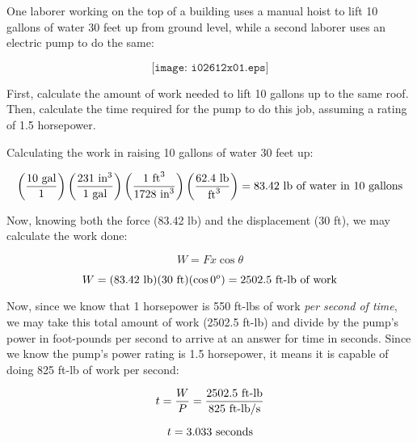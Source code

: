 

One laborer working on the top of a building uses a manual hoist to lift 10 gallons of water 30 feet up from ground level, while a second laborer uses an electric pump to do the same:

$$\texttt{[image: i02612x01.eps]}$$

First, calculate the amount of work needed to lift 10 gallons up to the same roof.  Then, calculate the time required for the pump to do this job, assuming a rating of 1.5 horsepower.







Calculating the work in raising 10 gallons of water 30 feet up:

$$\left( 10 \hbox{ gal} \over 1 \right) \left(231 \hbox{ in}^3 \over 1 \hbox{ gal} \right) \left(1 \hbox{ ft}^3 \over 1728 \hbox{ in}^3 \right) \left(62.4 \hbox{ lb} \over \hbox{ ft}^3 \right) = 83.42 \hbox{ lb of water in 10 gallons}$$

Now, knowing both the force (83.42 lb) and the displacement (30 ft), we may calculate the work done:

$$W = F x \cos \theta$$

$$W = (83.42 \hbox{ lb})(30 \hbox{ ft})(\cos 0^o) = 2502.5 \hbox{ ft-lb of work}$$

\vskip 20pt

Now, since we know that 1 horsepower is 550 ft-lbs of work {\it per second of time}, we may take this total amount of work (2502.5 ft-lb) and divide by the pump's power in foot-pounds per second to arrive at an answer for time in seconds.  Since we know the pump's power rating is 1.5 horsepower, it means it is capable of doing 825 ft-lb of work per second:

$$t = {W \over P} = {2502.5 \hbox{ ft-lb} \over 825 \hbox{ ft-lb/s}}$$

$$t = 3.033 \hbox{ seconds}$$











